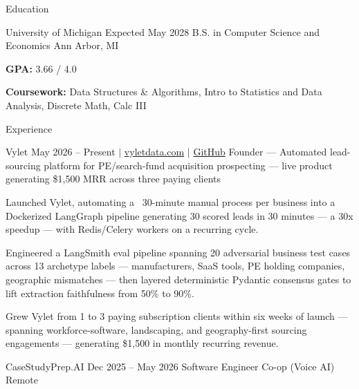 \documentclass[
	11pt
]{../../template}
\begin{document}
	\begin{rSection}{E}{ducation}
		\begin{rSectionEntry}
			{University of Michigan}
			{Expected May 2028}
			{B.S. in Computer Science and Economics}
			{}
			{Ann Arbor, MI}

			\item \textbf{GPA:} 3.66 / 4.0
			\item \textbf{Coursework:} Data Structures \& Algorithms, Intro to Statistics and Data Analysis, Discrete Math, Calc III
		\end{rSectionEntry}
	\end{rSection}

	\begin{rSection}{E}{xperience}
		\begin{rSectionEntry}
			{Vylet}
			{May 2026 -- Present $\vert$ \href{https://vyletdata.com}{vyletdata.com} $\vert$ \href{https://github.com/Verdent06/Lead-Gen-Agentic-Pipeline}{GitHub}}
			{Founder --- Automated lead-sourcing platform for PE/search-fund acquisition prospecting --- live product generating \$1,500 MRR across three paying clients}
			{}
			{}

			\item Launched Vylet, automating a ~30-minute manual process per business into a Dockerized LangGraph pipeline generating 30 scored leads in 30 minutes --- a 30x speedup --- with Redis/Celery workers on a recurring cycle.
			\item Engineered a LangSmith eval pipeline spanning 20 adversarial business test cases across 13 archetype labels --- manufacturers, SaaS tools, PE holding companies, geographic mismatches --- then layered deterministic Pydantic consensus gates to lift extraction faithfulness from 50\% to 90\%.
			\item Grew Vylet from 1 to 3 paying subscription clients within six weeks of launch --- spanning workforce-software, landscaping, and geography-first sourcing engagements --- generating \$1,500 in monthly recurring revenue.
		\end{rSectionEntry}

		\begin{rSectionEntry}
			{CaseStudyPrep.AI}
			{Dec 2025 -- May 2026}
			{Software Engineer Co-op (Voice AI)}
			{}
			{Remote}


\end{rSectionEntry}
\end{rSection}
\end{document}
